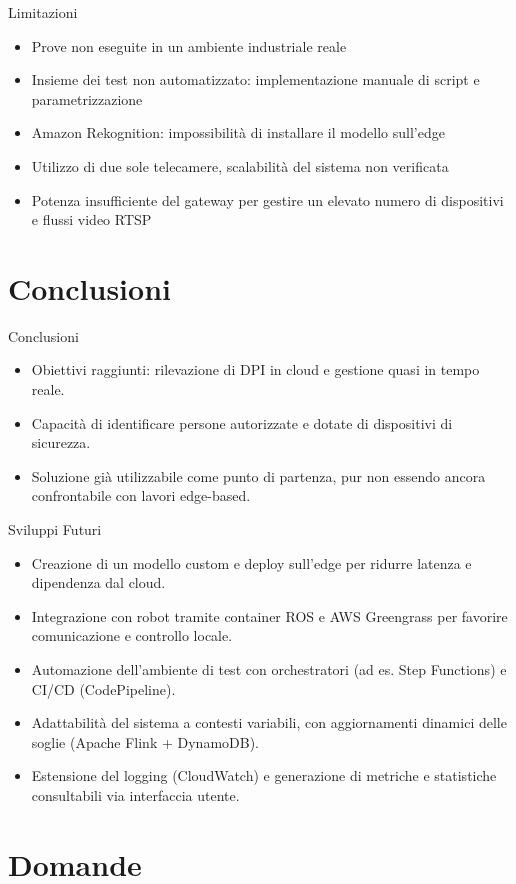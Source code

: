 \documentclass{beamer}
\begin{document}
\begin{frame}{Limitazioni}
\begin{itemize}
    \item Prove non eseguite in un ambiente industriale reale
    \item Insieme dei test non automatizzato: implementazione manuale di script e parametrizzazione
    \item Amazon Rekognition: impossibilità di installare il modello sull'edge
    \item Utilizzo di due sole telecamere, scalabilità del sistema non verificata
    \item Potenza insufficiente del gateway per gestire un elevato numero di dispositivi e flussi video RTSP
\end{itemize}
\end{frame}

\section{Conclusioni}

\begin{frame}{Conclusioni}
\begin{itemize}
    \item Obiettivi raggiunti: rilevazione di DPI in cloud e gestione quasi in tempo reale.
    \item Capacità di identificare persone autorizzate e dotate di dispositivi di sicurezza.
    \item Soluzione già utilizzabile come punto di partenza, pur non essendo ancora confrontabile con lavori edge-based.
\end{itemize}
\end{frame}

\begin{frame}{Sviluppi Futuri}
\begin{itemize}
    \item Creazione di un modello custom e deploy sull’edge per ridurre latenza e dipendenza dal cloud.
    \item Integrazione con robot tramite container ROS e AWS Greengrass per favorire comunicazione e controllo locale.
    \item Automazione dell’ambiente di test con orchestratori (ad es. Step Functions) e CI/CD (CodePipeline).
    \item Adattabilità del sistema a contesti variabili, con aggiornamenti dinamici delle soglie (Apache Flink + DynamoDB).
    \item Estensione del logging (CloudWatch) e generazione di metriche e statistiche consultabili via interfaccia utente.
\end{itemize}
\end{frame}


\section*{Domande}

\backmatter
\end{document}
